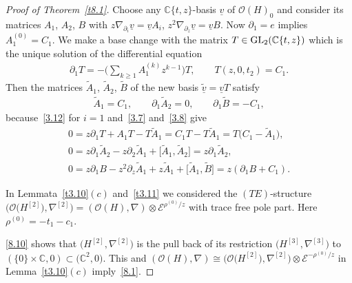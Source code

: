 \documentclass[10pt,a4paper]{amsart}
\numberwithin{equation}{section}
\numberwithin{figure}{section}
\newcommand{\C}{{\mathbb C}}
\newcommand{\EE}{{\mathcal E}}
\newcommand{\OO}{{\mathcal O}}
\newcommand{\www}{\widetilde}
\newcommand{\uuuu}{\underline}
\newcommand{\paa}{\partial}
\newcommand{\nnn}{\nabla}
\begin{document}
\begin{proof}[Proof of Theorem~\ref{t8.1}]
Choose any $\C\{t,z\}$-basis $\uuuu{v}$ of
$\OO(H)_0$ and consider its matrices
$A_1$, $A_2 $, $B$ with $z\nnn_{\paa_i}\uuuu{v}=\uuuu{v}A_i$,
$z^2\nnn_{\paa_z}\uuuu{v}=\uuuu{v}B$.
Now $\paa_1=e$ implies $A_1^{(0)}=C_1$.
We make a base change with the matrix $T\in {\rm GL}_2(\C\{t,z\})$
which is the unique solution of the differential equation
\begin{gather*}
\paa_1 T=-\bigg(\sum_{k\geq 1}A_1^{(k)}z^{k-1}\bigg)T,\qquad
T(z,0,t_2)=C_1.
\end{gather*}
Then the matrices $\www A_1$, $\www A_2$, $\www B$
of the new basis $\uuuu{\www v}=\uuuu{v}T$ satisfy
\begin{gather}\label{8.10}
\www A_1=C_1,\qquad \paa_1\www A_2=0,\qquad \paa_1\www B=-C_1,
\end{gather}
because~\eqref{3.12} for $i=1$ and~\eqref{3.7}
and~\eqref{3.8} give
\begin{gather*}
0= z\paa_1T+A_1T-T\www A_1=C_1T-T\www A_1=T\big(C_1-\www A_1\big),
\\
0= z\paa_1\www A_2-z\paa_2\www A_1+\big[\www A_1,\www A_2\big]= z\paa_1 \www A_2,
\\
0= z\paa_1B-z^2\paa_z\www A_1+z\www A_1+\big[\www A_1,\www B\big]= z(\paa_1B+C_1).
\end{gather*}

In Lemmata~\ref{t3.10}$(c)$ and~\ref{t3.11}
we considered the $(TE)$-structure
$\big(\OO\big(H^{[2]}\big),\nnn^{[2]}\big)=(\OO(H),\nnn)\allowbreak\otimes \EE^{\rho^{(0)}/z}$
with trace free pole part. Here $\rho^{(0)}=-t_1-c_1$.

\eqref{8.10} shows that $\big(H^{[2]},\nnn^{[2]}\big)$ is the pull
back of its restriction $\big(H^{[3]},\nnn^{[3]}\big)$ to
$(\{0\}\times \C,0)\subset \big(\C^2,0\big)$. This and
$(\OO(H),\nnn)\cong \big(\OO\big(H^{[2]}\big),\nnn^{[2]}\big)\otimes
\EE^{-\rho^{(0)}/z}$ in Lemma~\ref{t3.10}$(c)$ imply~\eqref{8.1}.
\end{proof}
\end{document}
